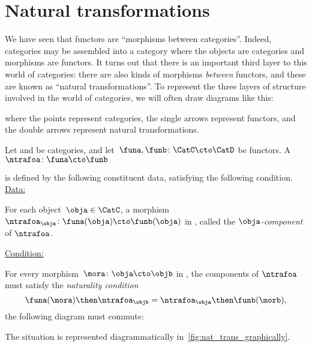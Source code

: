 

\section{Natural transformations}

We have seen that functors are ``morphisms between categories''. Indeed, categories may be assembled into a category \index{\Category} where the objects are categories and morphisms are functors. It turns out that there is an important third layer to this world of categories: there are also kinds of morphisms \emph{between} functors, and these are known as ``natural transformations''. To represent the three layers of structure involved in the world of categories, we will often draw diagrams like this:
\begin{center}
\end{center}

where the points represent categories, the single arrows represent functors, and the double arrows represent natural transformations.


\begin{ctdefinition}
  \label{def:natural-transformation}
  Let \CatC and \CatD be categories, and let~$\funa,\funb\colon \CatC\cto \CatD$ be functors. A \emph{}~$\ntrafoa \colon \funa\cto \funb$
  \begin{center}
  \end{center}
  is defined by the following constituent data, satisfying the following condition.
  \underline{Data:}
  \begin{compactenum}
    \item For each object~$\obja\in \CatC$, a morphism $\ntrafoa_\obja \colon \funa(\obja)\cto \funb(\obja)$ in \CatD, called the $\obja$\emph{-component} of $\ntrafoa$.
  \end{compactenum}
  \underline{Condition:}
  \begin{compactenum}
    \item For every morphism~$\mora\colon \obja\cto \objb$ in \CatC, the components of $\ntrafoa$ must satisfy the \emph{naturality condition}
    \begin{equation}
      \funa(\mora)\then \ntrafoa_\objb = \ntrafoa_\obja\then \funb(\morb),
    \end{equation}
    \ie  the following diagram must commute:
    \begin{center}
    \end{center}
  \end{compactenum}
  The situation is represented diagrammatically in~\cref{fig:nat_trans_graphically}.
\end{ctdefinition}


